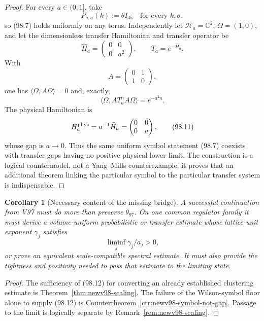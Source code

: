 \documentclass[11pt,oneside]{article}
\newtheorem{corollary}[theorem]{Corollary}
\theoremstyle{definition}
\theoremstyle{remark}
\begin{document}
\begin{proof}
For every \(a\in(0,1]\), take
\[
 P_{a,\sigma}(k):=\theta I_{45}
 \quad\text{for every }k,\sigma,                     \tag{98.8}
\]
so (98.7) holds uniformly on any torus.  Independently let
\(\mathcal H_a=\mathbb C^2\), \(\Omega=(1,0)\), and let the
dimensionless transfer Hamiltonian and transfer operator be
\[
 \widehat H_a=
 \begin{pmatrix}0&0\\0&a^2\end{pmatrix},
 \qquad T_a=e^{-\widehat H_a}.                       \tag{98.9}
\]
With
\[
 A=\begin{pmatrix}0&1\\1&0\end{pmatrix},
\]
one has \(\langle\Omega,A\Omega\rangle=0\) and, exactly,
\[
 \langle\Omega,A T_a^n A\Omega\rangle=e^{-a^2n}.
                                                               \tag{98.10}
\]
The physical Hamiltonian is
\[
 H_a^{\rm phys}=a^{-1}\widehat H_a
 =\begin{pmatrix}0&0\\0&a\end{pmatrix},             \tag{98.11}
\]
whose gap is \(a\to0\).  Thus the same uniform symbol statement
(98.7) coexists with transfer gaps having no positive physical
lower limit.  The construction is a logical countermodel, not a
Yang--Mills counterexample: it proves that an additional theorem
linking the particular symbol to the particular transfer system is
indispensable.
\end{proof}

\begin{corollary}[Necessary content of the missing bridge]
\label{cor:newv98-required-bridge}
A successful continuation from V97 must do more than preserve
\(\theta_{97}\).  On one common regulator family it must derive a
volume-uniform probabilistic or transfer estimate whose
lattice-unit exponent \(\gamma_j\) satisfies
\[
 \liminf_j\gamma_j/a_j>0,                            \tag{98.12}
\]
or prove an equivalent scale-compatible spectral estimate.  It
must also provide the tightness and positivity needed to pass that
estimate to the limiting state.
\end{corollary}

\begin{proof}
The sufficiency of (98.12) for converting an already established
clustering estimate is Theorem~\ref{thm:newv98-scaling}.  The
failure of the Wilson-symbol floor alone to supply (98.12) is
Countertheorem~\ref{ctr:newv98-symbol-not-gap}.  Passage to the
limit is logically separate by
Remark~\ref{rem:newv98-scaling}.
\end{proof}
\end{document}

